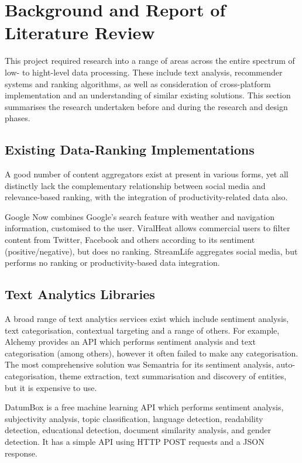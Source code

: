 \chapter{Background and Report of Literature Review}

This project required research into a range of areas across the entire spectrum of low- to hight-level data processing. These include text analysis, recommender systems and ranking algorithms, as well as consideration of cross-platform implementation and an understanding of similar existing solutions. This section summarises the research undertaken before and during the research and design phases.

\section{Existing Data-Ranking Implementations}

A good number of content aggregators exist at present in various forms, yet all distinctly lack the complementary relationship between social media and relevance-based ranking, with the integration of productivity-related data also. 

Google Now \cite{GoogleNow} combines Google's search feature with weather and navigation information, customised to the user. ViralHeat \cite{ViralHeat} allows commercial users to filter content from Twitter, Facebook and others according to its sentiment (positive/negative), but does no ranking. StreamLife \cite{StreamLife} aggregates social media, but performs no ranking or productivity-based data integration. 

\section{Text Analytics Libraries}

A broad range of text analytics services exist which include sentiment analysis, text categorisation, contextual targeting and a range of others. For example, Alchemy \cite{AlchemyAPI} provides an API which performs sentiment analysis and text categorisation (among others), however it often failed to make any categorisation. The most comprehensive solution was Semantria \cite{Semantria} for its sentiment analysis, auto-categorisation, theme extraction, text summarisation and discovery of entities, but it is expensive to use. 

DatumBox \cite{DatumBox} is a free machine learning API which performs sentiment analysis, subjectivity analysis, topic classification, language detection, readability detection, educational detection, document similarity analysis, and gender detection. It has a simple API using HTTP POST requests and a JSON response. 

